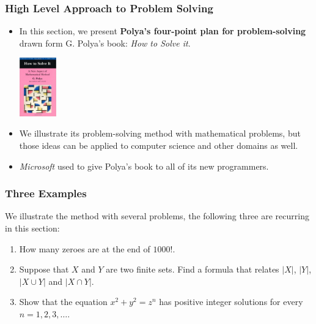 \documentclass{beamer}
\begin{document}
\begin{frame}%
\frametitle{High Level Approach to Problem Solving}

\begin{itemize}
\item In this section, we present \textbf{Polya's four-point plan for problem-solving} drawn
form G. Polya's book: \emph{How to Solve it}.\\

\begin{center}
\includegraphics[width=1.6cm]{polya.jpg}
\end{center}


\item<2-> We illustrate its problem-solving method with mathematical problems, but those
ideas can be applied to computer science and other domains as well.\\


\item<3-> \emph{Microsoft} used to give Polya's book to all of its new programmers.

\end{itemize}

\end{frame}

\begin{frame}%
\frametitle{Three Examples}

We illustrate the method with several problems, the following three are recurring in this section:

\begin{enumerate}

\item<1-> How many zeroes are at the end of $1000!$.

\vspace{0.2cm}

\item<2-> Suppose that $X$ and $Y$ are two finite sets. Find a formula that relates
$|X|$, $|Y|$, $|X\cup Y|$ and $|X\cap Y|$.

\vspace{0.2cm}

\item<3-> Show that the equation $x^2 + y^2 = z^n$ has positive integer solutions for every $n = 1, 2, 3, \ldots$.

\end{enumerate}

\end{frame}
\end{document}
